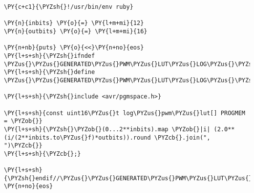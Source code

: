 \begin{Verbatim}[commandchars=\\\{\}]
\PY{c+c1}{\PYZsh{}!/usr/bin/env ruby}

\PY{n}{inbits} \PY{o}{=} \PY{l+m+mi}{12}
\PY{n}{outbits} \PY{o}{=} \PY{l+m+mi}{16}

\PY{n+nb}{puts} \PY{o}{<<}\PY{n+no}{eos}
\PY{l+s+sh}{\PYZsh{}ifndef \PYZus{}\PYZus{}GENERATED\PYZus{}PWM\PYZus{}LUT\PYZus{}LOG\PYZus{}\PYZsh{}\PYZob{}inbits\PYZcb{}\PYZus{}\PYZsh{}\PYZob{}outbits\PYZcb{}\PYZus{}\PYZus{}}
\PY{l+s+sh}{\PYZsh{}define \PYZus{}\PYZus{}GENERATED\PYZus{}PWM\PYZus{}LUT\PYZus{}LOG\PYZus{}\PYZsh{}\PYZob{}inbits\PYZcb{}\PYZus{}\PYZsh{}\PYZob{}outbits\PYZcb{}\PYZus{}\PYZus{}}

\PY{l+s+sh}{\PYZsh{}include <avr/pgmspace.h>}

\PY{l+s+sh}{const uint16\PYZus{}t log\PYZus{}pwm\PYZus{}lut[] PROGMEM = \PYZob{}}
\PY{l+s+sh}{\PYZsh{}\PYZob{}(0...2**inbits).map \PYZob{}|i| (2.0**(i/(2**inbits.to\PYZus{}f)*outbits)).round \PYZcb{}.join(", ")\PYZcb{}}
\PY{l+s+sh}{\PYZcb{};}

\PY{l+s+sh}{\PYZsh{}endif//\PYZus{}\PYZus{}GENERATED\PYZus{}PWM\PYZus{}LUT\PYZus{}LOG\PYZus{}\PYZsh{}\PYZob{}inbits\PYZcb{}\PYZus{}\PYZsh{}\PYZob{}outbits\PYZcb{}\PYZus{}\PYZus{}}
\PY{n+no}{eos}
\end{Verbatim}
